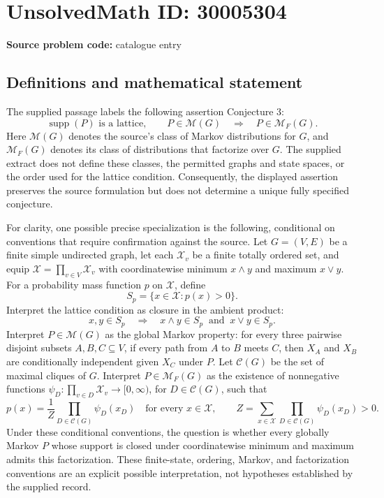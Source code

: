 \documentclass[11pt]{article}
\begin{document}
\section*{UnsolvedMath ID: 30005304}
\textbf{Source problem code:} catalogue entry
\subsection{Definitions and mathematical statement}
The supplied passage labels the following assertion Conjecture 3:
\[
\operatorname{supp}(P)\text{ is a lattice},\qquad P\in\mathcal M(G)
\quad\Longrightarrow\quad P\in\mathcal M_F(G).
\]
Here \(\mathcal M(G)\) denotes the source's class of Markov distributions for \(G\), and \(\mathcal M_F(G)\) denotes its class of distributions that factorize over \(G\). The supplied extract does not define these classes, the permitted graphs and state spaces, or the order used for the lattice condition. Consequently, the displayed assertion preserves the source formulation but does not determine a unique fully specified conjecture.

For clarity, one possible precise specialization is the following, conditional on conventions that require confirmation against the source. Let \(G=(V,E)\) be a finite simple undirected graph, let each \(\mathcal X_v\) be a finite totally ordered set, and equip \(\mathcal X=\prod_{v\in V}\mathcal X_v\) with coordinatewise minimum \(x\wedge y\) and maximum \(x\vee y\). For a probability mass function \(p\) on \(\mathcal X\), define
\[
S_p=\{x\in\mathcal X:p(x)>0\}.
\]
Interpret the lattice condition as closure in the ambient product:
\[
x,y\in S_p\quad\Longrightarrow\quad x\wedge y\in S_p\ \text{ and }\ x\vee y\in S_p.
\]
Interpret \(P\in\mathcal M(G)\) as the global Markov property: for every three pairwise disjoint subsets \(A,B,C\subseteq V\), if every path from \(A\) to \(B\) meets \(C\), then \(X_A\) and \(X_B\) are conditionally independent given \(X_C\) under \(P\). Let \(\mathcal C(G)\) be the set of maximal cliques of \(G\). Interpret \(P\in\mathcal M_F(G)\) as the existence of nonnegative functions \(\psi_D:\prod_{v\in D}\mathcal X_v\to[0,\infty)\), for \(D\in\mathcal C(G)\), such that
\[
p(x)=\frac{1}{Z}\prod_{D\in\mathcal C(G)}\psi_D(x_D)
\quad\text{for every }x\in\mathcal X,\qquad
Z=\sum_{x\in\mathcal X}\prod_{D\in\mathcal C(G)}\psi_D(x_D)>0.
\]
Under these conditional conventions, the question is whether every globally Markov \(P\) whose support is closed under coordinatewise minimum and maximum admits this factorization. These finite-state, ordering, Markov, and factorization conventions are an explicit possible interpretation, not hypotheses established by the supplied record.
\end{document}
